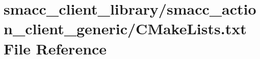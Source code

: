 \hypertarget{client__library_2smacc__action__client__generic_2CMakeLists_8txt}{}\section{smacc\+\_\+client\+\_\+library/smacc\+\_\+action\+\_\+client\+\_\+generic/\+C\+Make\+Lists.txt File Reference}
\label{client__library_2smacc__action__client__generic_2CMakeLists_8txt}
